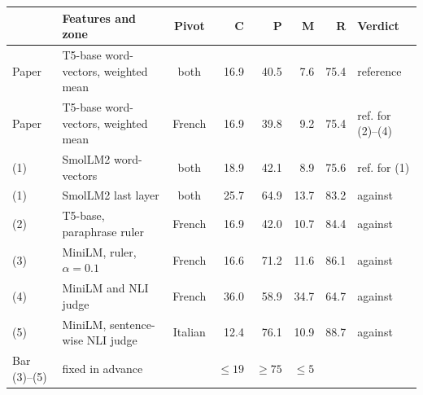 \begin{tabular}{llcrrrrl}
    \toprule
    & Features and zone & Pivot & \textsf{C} & \textsf{P} & \textsf{M} & \textsf{R} & Verdict \\
    \midrule
    Paper & T5-base word-vectors, weighted mean & both & 16.9 & 40.5 & 7.6 & 75.4 & reference \\
    Paper & T5-base word-vectors, weighted mean & French & 16.9 & 39.8 & 9.2 & 75.4 & ref. for (2)--(4) \\
    \midrule
    (1) & SmolLM2 word-vectors & both & 18.9 & 42.1 & 8.9 & 75.6 & ref. for (1) \\
    (1) & SmolLM2 last layer & both & 25.7 & 64.9 & 13.7 & 83.2 & against \\
    (2) & T5-base, paraphrase ruler & French & 16.9 & 42.0 & 10.7 & 84.4 & against \\
    (3) & MiniLM, ruler, $\alpha = 0.1$ & French & 16.6 & 71.2 & 11.6 & 86.1 & against \\
    (4) & MiniLM and NLI judge & French & 36.0 & 58.9 & 34.7 & 64.7 & against \\
    (5) & MiniLM, sentence-wise NLI judge & Italian & 12.4 & 76.1 & 10.9 & 88.7 & against \\
    \midrule
    Bar (3)--(5) & \multicolumn{2}{l}{fixed in advance} & $\le 19$ & $\ge 75$ & $\le 5$ & & \\
    \bottomrule
\end{tabular}
